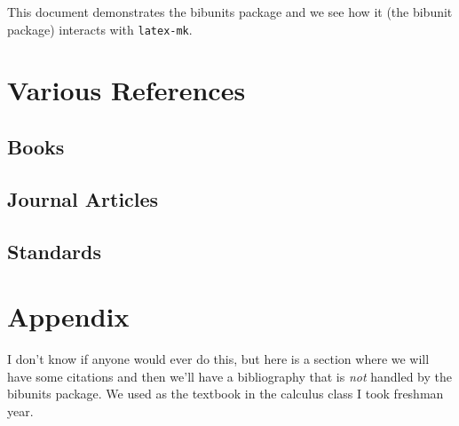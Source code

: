 \documentclass[final, letterpaper, 10pt]{article}
\begin{document}
This document demonstrates the bibunits package and we see how it
(the bibunit package) interacts with {\tt latex-mk}.

\section*{Various References}
\renewcommand{\refname}{}

\subsection*{Books}
\begin{bibunit}[IEEEtran]
  \nocite{churchill84, cover91}
\end{bibunit}

\subsection*{Journal Articles}
\begin{bibunit}[IEEEtran]
  \nocite{fano50, green54}
\end{bibunit}

\subsection*{Standards}
\begin{bibunit}[IEEEtran]
  \nocite{en300.175-2v1.4.2}
\end{bibunit}


\section{Appendix}
I don't know if anyone would ever do this, but here is a section
where we will have some citations and then we'll have a bibliography
that is {\em not} handled by the bibunits package.  We used \cite{hildebrand76} 
as the textbook in the calculus class I took freshman year.



\end{document}
